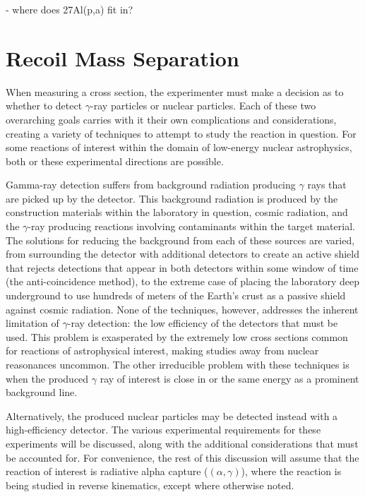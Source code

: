 - where does 27Al(p,a) fit in?


\section{Recoil Mass Separation}

When measuring a cross section, the experimenter must make a decision as to
whether to detect $\gamma$-ray particles or nuclear particles. Each of these
two overarching goals carries with it their own complications and
considerations, creating a variety of techniques to attempt to study the
reaction in question. For some reactions of interest within the domain of
low-energy nuclear astrophysics, both or these experimental directions are
possible.

Gamma-ray detection suffers from background radiation producing $\gamma$ rays
that are picked up by the detector. This background radiation is produced by
the construction materials within the laboratory in question, cosmic radiation,
and the $\gamma$-ray producing reactions involving contaminants within the
target material. The solutions for reducing the background from each of these
sources are varied, from surrounding the detector with additional detectors to
create an active shield that rejects detections that appear in both detectors
within some window of time (the anti-coincidence method), to the extreme case
of placing the laboratory deep underground to use hundreds of meters of the
Earth's crust as a passive shield against cosmic radiation. None of the
techniques, however, addresses the inherent limitation of $\gamma$-ray
detection: the low efficiency of the detectors that must be used. This problem
is exasperated by the extremely low cross sections common for reactions of
astrophysical interest, making studies away from nuclear reasonances uncommon.
The other irreducible problem with these techniques is when the produced
$\gamma$ ray of interest is close in or the same energy as a prominent
background line.

Alternatively, the produced nuclear particles may be detected instead with a
high-efficiency detector. The various experimental requirements for these
experiments will be discussed, along with the additional considerations that
must be accounted for. For convenience, the rest of this discussion will assume
that the reaction of interest is radiative alpha capture ($(\alpha,\gamma)$),
where the reaction is being studied in reverse kinematics, except where
otherwise noted.

